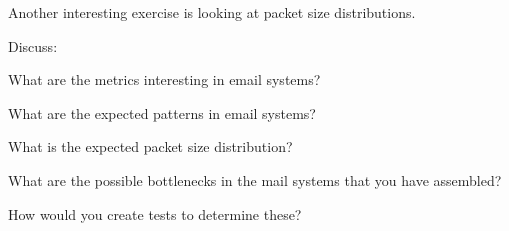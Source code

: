 \documentclass{slides}
\begin{document}
Another interesting exercise is looking at packet size distributions.


Discuss:

\bi
\item What are the metrics interesting in email systems?
\item What are the expected patterns in email systems?
\item What is the expected packet size distribution?
\item What are the possible bottlenecks in the mail systems that 
  you have assembled?
\item How would you create tests to determine these?
\ei
\end{document}
